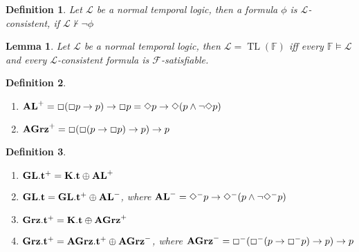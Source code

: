 \documentclass[a4paper]{article}
\theoremstyle{defin}
\newtheorem{defin}{Definition}
\theoremstyle{theorem}
\theoremstyle{prop}
\theoremstyle{lemma}
\newtheorem{lemma}{Lemma}
\theoremstyle{ex}
\theoremstyle{col}
\newcommand{\BoxM}{\Box^{-}}
\newcommand{\DiamondM}{\Diamond^{-}}
\begin{document}
\begin{defin}
  Let $\mathcal{L}$ be a normal temporal logic, then a formula $\phi$ is $\mathcal{L}$-consistent, if $\mathcal{L} \nvdash \neg \phi$
\end{defin}

\begin{lemma}
  Let $\mathcal{L}$ be a normal temporal logic, then $\mathcal{L} = \operatorname{TL}(\mathbb{F})$ iff every $\mathbb{F} \models \mathcal{L}$ and every $\mathcal{L}$-consistent formula is $\mathcal{F}$-satisfiable.
\end{lemma}

\begin{defin}
$ $

  \begin{enumerate}
    \item ${\bf AL}^{+} = \Box (\Box p \to p) \to \Box p = \Diamond p \to \Diamond (p \land \neg \Diamond p)$
    \item ${\bf AGrz}^{+} = \Box (\Box (p \to \Box p) \to p) \to p$
  \end{enumerate}
\end{defin}

\begin{defin}
$ $

  \begin{enumerate}
    \item ${\bf GL}.{\bf t}^{+} = {\bf K}.{\bf t} \oplus {\bf AL}^{+}$
    \item ${\bf GL}.{\bf t} = {\bf GL}.{\bf t}^{+} \oplus {\bf AL}^{-}$, where ${\bf AL}^{-} = \DiamondM p \to \DiamondM (p \land \neg \DiamondM p)$
    \item ${\bf Grz}.{\bf t}^{+} = {\bf K}.{\bf t} \oplus {\bf AGrz}^{+}$
    \item ${\bf Grz}.{\bf t}^{+} = {\bf AGrz}.{\bf t}^{+} \oplus {\bf AGrz}^{-}$, where ${\bf AGrz}^{-} = \BoxM (\BoxM (p \to \BoxM p) \to p) \to p$
  \end{enumerate}
\end{defin}
\end{document}
